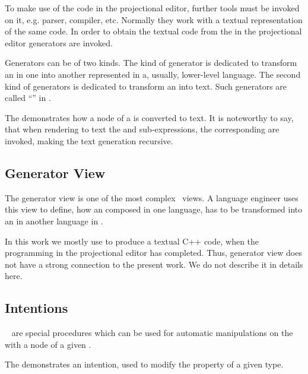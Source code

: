 To make use of the code in the projectional editor, further tools must be invoked on it, e.g. parser, compiler, etc.
Normally they work with a textual representation of the same code. In order to obtain the textual code from the  in the projectional
editor generators are invoked. 

Generators can be of two kinds. The kind of generator is dedicated to transform an  in one  into
another  represented in a, usually, lower-level language. The second kind of generators is dedicated to transform an  into text.
Such generators are called ``'' in \jbmps.


The  demonstrates how a node of a   is converted to text. It is noteworthy 
to say, that when rendering to text the  and  sub-expressions, the corresponding  are invoked,
making the text generation recursive.


\subsection{Generator View}
\label{generators}
The generator view is one of the most complex \jbmps\ views. A language engineer uses this view to define, how an  composed
in one language, has to be transformed into an  in another language in \jbmps.

In this work we mostly use  to produce a textual C++ code, when the programming in the projectional editor has completed.
Thus, generator view does not have a strong connection to the present work. We do not describe it in details here.

\subsection{Intentions}
\label{intentions}

\jbmps\  are special procedures which can be used for automatic manipulations on the  with a node of a given .


The  demonstrates an intention, used to modify the  property of a given type. 

